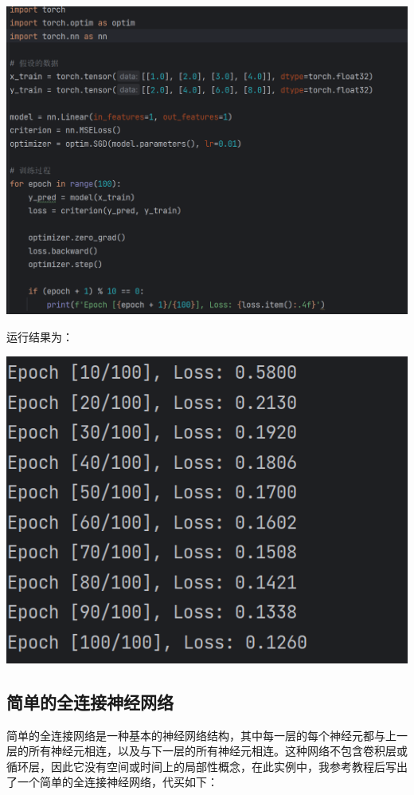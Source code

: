 \documentclass[UTF8,a4paper]{ctexart}
\begin{document}
\begin{sloppypar}
	\includegraphics[width = 14cm]{39}
	
	运行结果为：
	
	\includegraphics[width = 14cm]{40}
	
	
	\subsection{简单的全连接神经网络}
	简单的全连接网络是一种基本的神经网络结构，其中每一层的每个神经元都与上一层的所有神经元相连，以及与下一层的所有神经元相连。这种网络不包含卷积层或循环层，因此它没有空间或时间上的局部性概念，在此实例中，我参考教程后写出了一个简单的全连接神经网络，代买如下：
	

\end{sloppypar}
\end{document}
